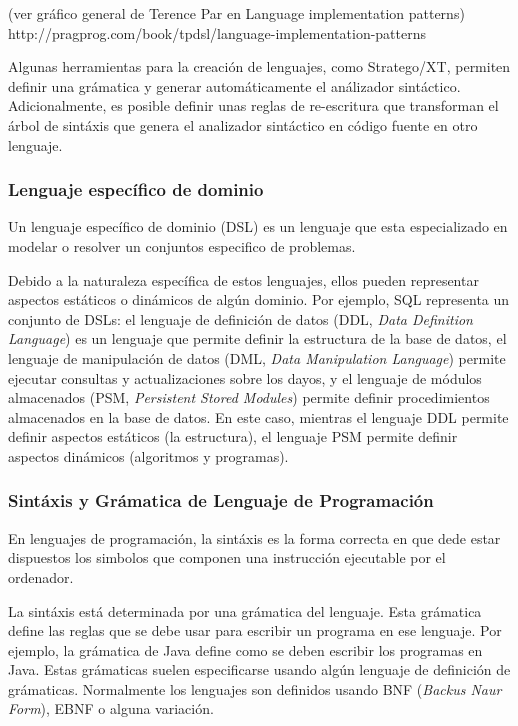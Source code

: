 (ver gráfico general de Terence Par en Language implementation patterns)
http://pragprog.com/book/tpdsl/language-implementation-patterns

Algunas herramientas para la creación de lenguajes, como Stratego/XT, permiten definir una grámatica y generar automáticamente el análizador sintáctico.
Adicionalmente, es posible definir unas reglas de re-escritura que transforman el árbol de sintáxis que genera el analizador sintáctico en código fuente en otro lenguaje.

\subsubsection{Lenguaje específico de dominio}

Un lenguaje específico de dominio (DSL) es un lenguaje que esta especializado en modelar o resolver un conjuntos especifico de problemas.

Debido a la naturaleza específica de estos lenguajes, ellos pueden representar aspectos estáticos o dinámicos de algún dominio.
Por ejemplo, SQL representa un conjunto de DSLs:
el lenguaje de definición de datos (DDL, \textit{Data Definition Language}) es un lenguaje que permite definir la estructura de la base de datos,
el lenguaje de manipulación de datos (DML, \textit{Data Manipulation Language}) permite ejecutar consultas y actualizaciones sobre los dayos,
y el lenguaje de módulos almacenados (PSM, \textit{Persistent Stored Modules}) permite definir procedimientos almacenados en la base de datos.
En este caso, mientras el lenguaje DDL permite definir aspectos estáticos (la estructura), el lenguaje PSM permite definir aspectos dinámicos (algoritmos y programas).   

\subsubsection{Sintáxis y Grámatica de Lenguaje de Programación}

En lenguajes de programación, la sintáxis es la forma correcta en que dede estar dispuestos los simbolos que componen una instrucción ejecutable por el ordenador.

La sintáxis está determinada por una grámatica del lenguaje.
Esta grámatica define las reglas que se debe usar para escribir un programa en ese lenguaje.
Por ejemplo, la grámatica de Java define como se deben escribir los programas en Java.
Estas grámaticas suelen especificarse usando algún lenguaje de definición de grámaticas. 
Normalmente los lenguajes son definidos usando BNF (\textit{Backus Naur Form}), EBNF o alguna variación.

